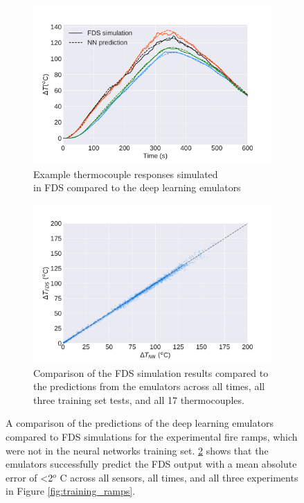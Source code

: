 \documentclass{article}
\begin{document}
\begin{figure}[htbp]
  \centering
  \begin{subfigure}[t]{.45\textwidth}
      \centering
      \includegraphics[width=\textwidth,keepaspectratio]{figures/forward_NN_examples.pdf}
      \caption{Example thermocouple responses simulated \\ in FDS compared to the deep learning emulators }
      \label{fig:forward_NN_examples}
  \end{subfigure}
  \begin{subfigure}[t]{.45\textwidth}
      \centering
      \includegraphics[width=\textwidth ,keepaspectratio]{figures/forward_error_scatter.pdf}
      \caption{Comparison of the FDS simulation results compared to the predictions from the emulators across all times, all three training set tests, and all 17 thermocouples.  }
      \label{fig:forward_error_scatter}
  \end{subfigure}
  \caption{A comparison of the predictions of the deep learning emulators compared to FDS simulations for the experimental fire ramps, which were not in the neural networks training set. \protect\ref{fig:forward_error_scatter} shows that the emulators successfully predict the FDS output with a mean absolute error of <2$^o$ C across all sensors, all times, and all three experiments in Figure \protect\ref{fig:training_ramps}.} 
  \label{fig:forward_error}
\end{figure}
\end{document}
